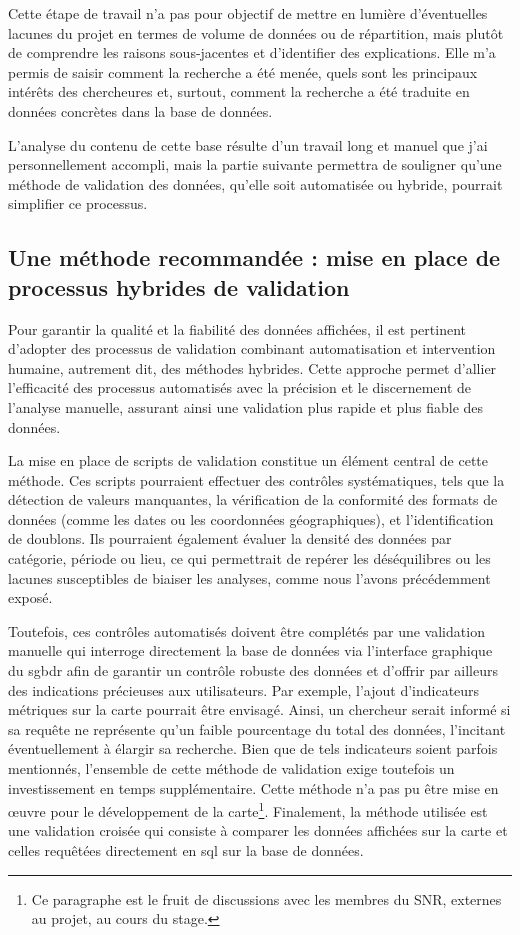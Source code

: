 Cette étape de travail n'a pas pour objectif de mettre en lumière d'éventuelles lacunes du projet en termes de volume de données ou de répartition, mais plutôt de comprendre les raisons sous-jacentes et d'identifier des explications. Elle m'a permis de saisir comment la recherche a été menée, quels sont les principaux intérêts des chercheures et, surtout, comment la recherche a été traduite en données concrètes dans la base de données.

L'analyse du contenu de cette base résulte d'un travail long et manuel que j'ai personnellement accompli, mais la partie suivante permettra de souligner qu'une méthode de validation des données, qu'elle soit automatisée ou hybride, pourrait simplifier ce processus.

\subsection{Une méthode recommandée : mise en place de processus hybrides de validation}

Pour garantir la qualité et la fiabilité des données affichées, il est pertinent d'adopter des processus de validation combinant automatisation et intervention humaine, autrement dit, des méthodes hybrides. Cette approche permet d'allier l'efficacité des processus automatisés avec la précision et le discernement de l'analyse manuelle, assurant ainsi une validation plus rapide et plus fiable des données.

La mise en place de scripts de validation constitue un élément central de cette méthode. Ces scripts pourraient effectuer des contrôles systématiques, tels que la détection de valeurs manquantes, la vérification de la conformité des formats de données (comme les dates ou les coordonnées géographiques), et l'identification de doublons. Ils pourraient également évaluer la densité des données par catégorie, période ou lieu, ce qui permettrait de repérer les déséquilibres ou les lacunes susceptibles de biaiser les analyses, comme nous l'avons précédemment exposé. 

Toutefois, ces contrôles automatisés doivent être complétés par une validation manuelle qui interroge directement la base de données via l'interface graphique du  \acrshort{sgbdr} afin de garantir un contrôle robuste des données et d'offrir par ailleurs des indications précieuses aux utilisateurs. Par exemple, l'ajout d'indicateurs métriques sur la carte pourrait être envisagé. Ainsi, un chercheur serait informé si sa requête ne représente qu'un faible pourcentage du total des données, l'incitant éventuellement à élargir sa recherche. Bien que de tels indicateurs soient parfois mentionnés, l'ensemble de cette méthode de validation exige toutefois un investissement en temps supplémentaire. Cette méthode n'a pas pu être mise en œuvre pour le développement de la carte\footnote{Ce paragraphe est le fruit de discussions avec les membres du SNR, externes au projet, au cours du stage.}. Finalement, la méthode utilisée est une validation croisée qui consiste à comparer les données affichées sur la carte et celles requêtées directement en  \acrshort{sql} sur la base de données. 


